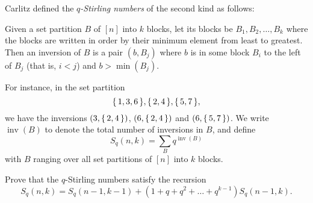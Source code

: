 \documentclass[12pt]{memoir}
\DeclareMathOperator{\inv}{inv}
\begin{document}
\begin{Ej}[Exercise 5]
Carlitz defined the \emph{$q$-Stirling numbers} of the second kind as follows:
\par
Given a set partition $B$ of $[n]$ into $k$ blocks, let its blocks be $B_1,B_2,\dots,B_k$ where the blocks are written in order by their minimum element from least to greatest. Then an inversion of $B$ is a pair $(b, B_j )$ where $b$ is in some block $B_i$ to the left of $B_j$ (that is, $i < j$) and $b > \min(B_j )$.\par 
For instance, in the set partition
$$\{\,1,3,6\,\},\{\,2,4\,\},\{\,5,7\,\},$$
we have the inversions $(3,\{\,2,4\,\})$, $(6,\{\,2,4\,\})$ and $(6,\{\,5,7\,\})$. We write $\inv(B)$ to denote the total number of inversions in $B$, and define 
$$S_q(n,k)=\sum_Bq^{\inv(B)}$$
with $B$ ranging over all set partitions of $[n]$ into $k$ blocks.\par 
Prove that the $q$-Stirling numbers satisfy the recursion
$$S_q(n,k)=S_q(n-1,k-1)+(1+q+q^2+\dots+q^{k-1})S_q(n-1,k).$$
\end{Ej}
\end{document}
